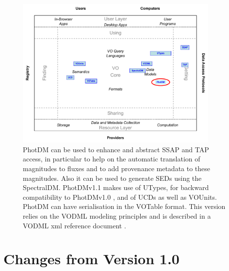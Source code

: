 \documentclass[11pt,a4paper]{ivoa}
\begin{document}
\begin{figure}[H]
\centering


\includegraphics[width=0.9\textwidth]{role_diagram.pdf}
\caption{PhotDM can be used to enhance and abstract SSAP and TAP access, in particular
to help on the automatic translation of magnitudes to fluxes and to add provenance
metadata to these magnitudes. Also it can be used to generate SEDs using the SpectralDM.
PhotDMv1.1 makes use of UTypes, for backward compatibility to PhotDMv1.0 , and of UCDs as well as VOUnits.
PhotDM can have  serialisation in the VOTable format. This version relies on the VODML modeling principles and
is described in a VODML xml reference document .}
\label{fig:archdiag}
\end{figure}

\section*{Changes from Version 1.0} \label{changesTable}

\end{document}
